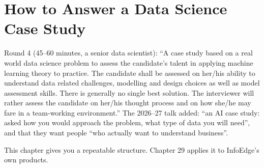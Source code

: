 \chapter{How to Answer a Data Science Case Study}

Round 4 (45--60 minutes, a senior data scientist): ``A case study based on a real world data science problem to assess the candidate's talent in
applying machine learning theory to practice. The candidate shall be assessed on her/his ability to understand data related challenges, modelling
and design choices as well as model assessment skills. There is generally no single best solution. The interviewer will rather assess the
candidate on her/his thought process and on how she/he may fare in a team-working environment.'' The 2026--27 talk added: ``an AI case study:
asked how you would approach the problem, what type of data you will need'', and that they want people ``who actually want to understand
business''.

This chapter gives you a repeatable structure. Chapter 29 applies it to InfoEdge's own products.

